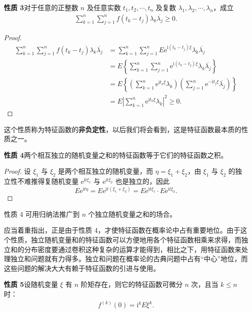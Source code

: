 \documentclass[../../main.tex]{subfiles}
\begin{document}
\noindent\textbf{性质 3}\quad 对于任意的正整数 $n$ 及任意实数 $t_1,t_2,\cdots,t_n$ 及复数 $\lambda_1,\lambda_2,\cdots,\lambda_n$，成立
\begin{align}
\sum_{k=1}^n\sum_{j=1}^n f(t_k-t_j)\lambda_k\overline{\lambda_j}\geqslant 0.\label{align:ch04-非负定}
\end{align}

\begin{proof}
\begin{align*}
\sum_{k=1}^n\sum_{j=1}^n f(t_k-t_j)\lambda_k\overline{\lambda_j}
&=\sum_{k=1}^n\sum_{j=1}^n E\mathrm{e}^{\mathrm{i}(t_k-t_j)\xi}\lambda_k\overline{\lambda_j}\\
&=E\left\{\sum_{k=1}^n\sum_{j=1}^n\mathrm{e}^{\mathrm{i}(t_k-t_j)\xi}\lambda_k\overline{\lambda_j}\right\}\\
&=E\left\{\left(\sum_{k=1}^n\mathrm{e}^{\mathrm{i}t_k\xi}\lambda_k\right)\left(\sum_{j=1}^n\mathrm{e}^{-\mathrm{i}t_j\xi}\overline{\lambda_j}\right)\right\}\\
&=E\left|\sum_{k=1}^n\mathrm{e}^{\mathrm{i}t_k\xi}\lambda_k\right|^2\geqslant 0.
\end{align*}
\end{proof}

这个性质称为特征函数的\textbf{非负定性}，以后我们将会看到，这是特征函数最本质的性质之一。

\noindent\textbf{性质 4}\quad 两个相互独立的随机变量之和的特征函数等于它们的特征函数之积。

\begin{proof}
设 $\xi_1$ 与 $\xi_2$ 是两个相互独立的随机变量，而 $\eta=\xi_1+\xi_2$，由 $\xi_1$ 与 $\xi_2$ 的独立性不难推得复随机变量 $\mathrm{e}^{\mathrm{i}t\xi_1}$ 与 $\mathrm{e}^{\mathrm{i}t\xi_2}$ 也是独立的，因此
\[
E\mathrm{e}^{\mathrm{i}t\eta}=E\mathrm{e}^{\mathrm{i}t(\xi_1+\xi_2)}=E\mathrm{e}^{\mathrm{i}t\xi_1}\cdot E\mathrm{e}^{\mathrm{i}t\xi_2}.
\]
\end{proof}

性质 4 可用归纳法推广到 $n$ 个独立随机变量之和的场合。

应当着重指出，正是由于性质 4，才使特征函数在概率论中占有重要地位。由于这个性质，独立随机变量和的特征函数可以方便地用各个特征函数相乘来求得，而独立和的分布密度要通过卷积这种复杂的运算才能得到，相比之下，用特征函数来处理独立和问题就有力得多。独立和问题在概率论的古典问题中占有``中心''地位，而这些问题的解决大大有赖于特征函数的引进与使用。

\noindent\textbf{性质 5}\quad 设随机变量 $\xi$ 有 $n$ 阶矩存在，则它的特征函数可微分 $n$ 次，且当 $k\leqslant n$ 时：
\begin{align}
f^{(k)}(0)=\mathrm{i}^k E\xi^k.\label{align:ch04-特征函数导数}
\end{align}
\end{document}
